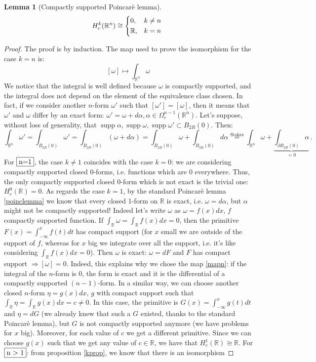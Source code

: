 \documentclass[a4paper,11pt,titlepage, article, oneside]{memoir}
\numberwithin{equation}{section}
\newtheorem{lemma}[theorem]{Lemma}
\theoremstyle{definition}
\theoremstyle{remark}
\DeclareMathOperator{\supp}{supp}
\newcommand{\rfield}{\mathbb{R}}
\begin{document}
\begin{lemma}[Compactly supported Poincarè lemma] \label{compsupppoinclemma}
\begin{equation}
H_c^k(\rfield^n) \cong
\begin{cases*}
0, & $k \not = n$ \\
\rfield, & $k = n$
\end{cases*}
\end{equation}
\end{lemma}
\begin{proof}
The proof is by induction. The map used to prove the isomorphism for the case $k = n$ is:
\begin{equation} \label{mapn}
[\omega] \mapsto \int_{\rfield^n} \omega
\end{equation}
We notice that the integral is well defined because $\omega$ is compactly supported, and the integral does not depend on the element of the equivalence class chosen. In fact, if we consider another $n$-form $\omega'$ such that $[\omega'] = [\omega]$, then it means that $\omega'$ and $\omega$ differ by an exact form: $\omega' = \omega + d \alpha, \alpha \in \Omega_c^{n-1}(\rfield^n)$. Let's suppose, without loss of generality, that $\supp \alpha, \supp \omega, \supp \omega' \subset B_{2R}(0)$. Then:
\[ \int_{\rfield^n} \omega' = \int_{B_{2R}(0)} \omega' = \int_{B_{2R}(0)}(\omega + d \alpha) = \int_{B_{2R}(0)}\omega + \int_{B_{2R}(0)} d \alpha \overset{\text{Stokes}} = \int_{\rfield^n} \omega + \underbrace{\int_{\partial B_{2R}(0)} \alpha}_{=0} \, . \]
For $\fbox{n=1}$, the case $k \not = 1$ coincides with the case $k=0$: we are considering compactly supported closed 0-forms, i.e. functions which are 0 everywhere. Thus, the only compactly supported closed 0-form which is not exact is the trivial one:  $H^0_c(\rfield) = 0$. As regards the case $k=1$, by the standard Poincarè lemma \eqref{poinclemma} we know that every closed 1-form on $\rfield$ is exact, i.e. $\omega = d\alpha$, but $\alpha$ might not be compactly supported! Indeed let's write $\omega$ as $\omega=f(x) dx$, $f$ compactly supported function. If $\int_{\rfield} \omega = \int_{\rfield} f(x)dx = 0$, then the primitive $F(x)=\int_{-\infty}^x f(t)dt$ has compact support (for $x$ small we are outside of the support of $f$, whereas for $x$ big we integrate over all the support, i.e. it's like considering $\int_{\rfield} f(x) dx = 0$). Then $\omega$ is exact: $\omega = dF$ and $F$ has compact support $\Rightarrow [\omega]=0$. Indeed, this explains why we chose the map \eqref{mapn}: if the integral of the $n$-form is 0, the form is exact and it is the differential of a compactly supported $(n-1)$-form. In a similar way, we can choose another closed $n$-form $\eta=g(x)dx,\, g$ with compact support such that $\int_{\rfield}\eta = \int_{\rfield} g(x)dx=c \not=0$. In this case, the primitive is $G(x) = \int_{-\infty}^x g(t)dt$ and $\eta = dG$ (we already knew that such a $G$ existed, thanks to the standard Poincarè lemma), but $G$ is not compactly supported anymore (we have problems for $x$ big). Moreover, for each value of $c$ we get a different primitive. Since we can choose $g(x)$ such that we get any value of $c \in \rfield$, we have that $H_c^1(\rfield) \cong \rfield$. For $\fbox{n > 1}$: from proposition \ref{kprop}, we know that there is an isomorphism

\end{proof}
\end{document}
